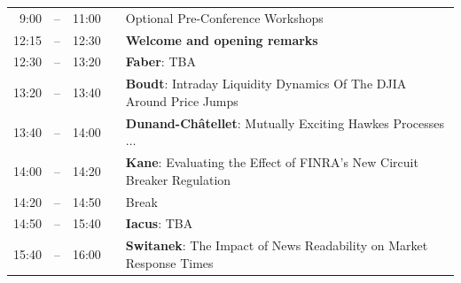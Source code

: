 \documentclass[10pt]{article}
\newcommand{\mylinecolor}[1]{\color{#1}\vspace{-8pt}}  %
\begin{document}
\begin{tabular}{rlrlp{5in}}
  9:00 & -- & 11:00 &   & \small{\mylinecolor{Breaks} Optional Pre-Conference Workshops} \\[5pt]
  12:15  & -- & 12:30  & & \textbf{\color{Breaks} Welcome and opening remarks} \\
  12:30 & -- & 13:20 &    & \textbf{\color{KeynoteTalk} Faber}: \small{TBA} \\
  13:20 & -- & 13:40 &    & \textbf{\color{Talk} Boudt}: \small{Intraday Liquidity Dynamics Of The DJIA Around Price Jumps} \\
  13:40 & -- & 14:00 &    & \textbf{\color{Talk} Dunand-Ch\^{a}tellet}: \small{Mutually Exciting Hawkes Processes $\ldots$} \\ %
  14:00 & -- & 14:20 &    & \textbf{\color{Talk} Kane}: \small{Evaluating the Effect of FINRA's New Circuit Breaker Regulation} \\
  14:20 & -- & 14:50 &    & \small{\mylinecolor{Breaks} Break} \\
  14:50 & -- & 15:40 &    & \textbf{\color{KeynoteTalk} Iacus}: \small{TBA} \\
  15:40 & -- & 16:00 &    & \textbf{\color{Talk} Switanek}: \small{The Impact of News Readability on Market Response Times} \\

\end{tabular}
\end{document}
